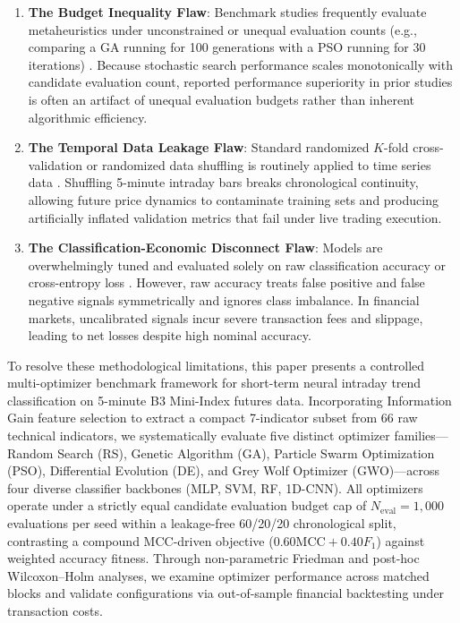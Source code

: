 \begin{enumerate}
    \item \textbf{The Budget Inequality Flaw}: Benchmark studies frequently evaluate metaheuristics under unconstrained or unequal evaluation counts (e.g., comparing a GA running for 100 generations with a PSO running for 30 iterations) \cite{dhingra2025solar}. Because stochastic search performance scales monotonically with candidate evaluation count, reported performance superiority in prior studies is often an artifact of unequal evaluation budgets rather than inherent algorithmic efficiency.
    \item \textbf{The Temporal Data Leakage Flaw}: Standard randomized $K$-fold cross-validation or randomized data shuffling is routinely applied to time series data \cite{makridakis2018statistical, dhingra2025solar}. Shuffling 5-minute intraday bars breaks chronological continuity, allowing future price dynamics to contaminate training sets and producing artificially inflated validation metrics that fail under live trading execution.
    \item \textbf{The Classification-Economic Disconnect Flaw}: Models are overwhelmingly tuned and evaluated solely on raw classification accuracy or cross-entropy loss \cite{chicco2020mcc}. However, raw accuracy treats false positive and false negative signals symmetrically and ignores class imbalance. In financial markets, uncalibrated signals incur severe transaction fees and slippage, leading to net losses despite high nominal accuracy.
\end{enumerate}

To resolve these methodological limitations, this paper presents a controlled multi-optimizer benchmark framework for short-term neural intraday trend classification on 5-minute B3 Mini-Index futures data. Incorporating Information Gain feature selection to extract a compact 7-indicator subset from 66 raw technical indicators, we systematically evaluate five distinct optimizer families---Random Search (RS), Genetic Algorithm (GA), Particle Swarm Optimization (PSO), Differential Evolution (DE), and Grey Wolf Optimizer (GWO)---across four diverse classifier backbones (MLP, SVM, RF, 1D-CNN). All optimizers operate under a strictly equal candidate evaluation budget cap of $N_{\mathrm{eval}} = 1{,}000$ evaluations per seed within a leakage-free 60/20/20 chronological split, contrasting a compound MCC-driven objective ($0.60\text{MCC} + 0.40F_1$) against weighted accuracy fitness. Through non-parametric Friedman and post-hoc Wilcoxon--Holm analyses, we examine optimizer performance across matched blocks and validate configurations via out-of-sample financial backtesting under transaction costs.

